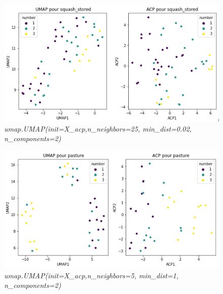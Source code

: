 \documentclass{beamer}
\theoremstyle{definition}
\begin{document}
\begin{frame}
	\begin{figure}
		\centering		
		\includegraphics[scale=0.4]{squash_stored.png}
		\textit{umap.UMAP(init=X\_acp,n\_neighbors=25, min\_dist=0.02, n\_components=2)}
	\end{figure}
	
\end{frame}

\begin{frame}
	\begin{figure}
		\centering		
		\includegraphics[scale=0.4]{pasture.png}
		\textit{umap.UMAP(init=X\_acp,n\_neighbors=5, min\_dist=1, n\_components=2)}
	\end{figure}
	
\end{frame}
\end{document}
